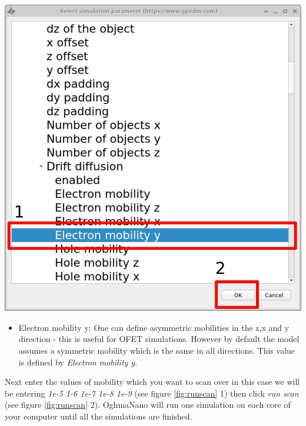 \begin{minipage}[]{0.5\linewidth}
\centering
\includegraphics[width=\textwidth]{./images/param_scan_select.png}
\label{fig:scanselect}

\end{minipage}

\begin{itemize}

  \item Electron mobility y: One can define asymmetric mobilities in the z,x and y direction - this is useful for OFET simulations.  However by default the model assumes a symmetric mobility which is the same in all directions. This value is defined by \emph{Electron mobility y}. 
\end{itemize}

Next enter the values of mobility which you want to scan over in this case we will be entering \emph{1e-5 1-6 1e-7 1e-8 1e-9} (see figure \ref{fig:runscan} 1) then click \emph{run scan} (see figure \ref{fig:runscan} 2). OghmaNano will run one simulation on each core of your computer until all the simulations are finished.

